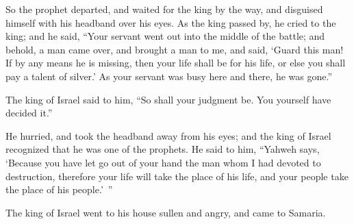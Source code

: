 {So the prophet departed, and waited for the king by the way, and disguised himself with his headband over his eyes.
As the king passed by, he cried to the king; and he said, “Your servant went out into the middle of the battle; and behold, a man came over, and brought a man to me, and said, ‘Guard this man! If by any means he is missing, then your life shall be for his life, or else you shall pay a talent of silver.’
As your servant was busy here and there, he was gone.”
\par }{\PP The king of Israel said to him, “So shall your judgment be. You yourself have decided it.”
\par }{\PP {}He hurried, and took the headband away from his eyes; and the king of Israel recognized that he was one of the prophets.
He said to him, “Yahweh says, ‘Because you have let go out of your hand the man whom I had devoted to destruction, therefore your life will take the place of his life, and your people take the place of his people.’ ”
\par }{\PP {}The king of Israel went to his house sullen and angry, and came to Samaria.

}
